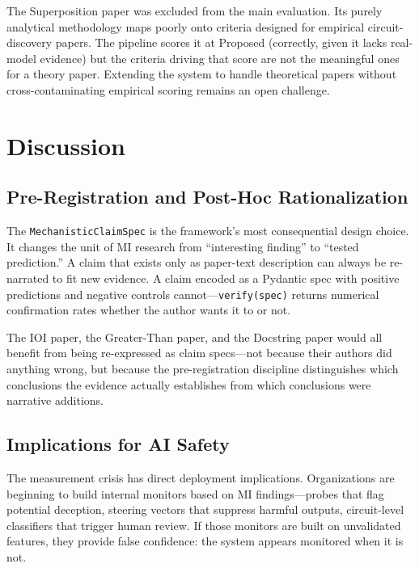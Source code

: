 \documentclass[10pt]{article}
\begin{document}
The Superposition paper \citep{elhage2022superposition} was excluded from the main evaluation. Its purely analytical methodology maps poorly onto criteria designed for empirical circuit-discovery papers. The pipeline scores it at Proposed (correctly, given it lacks real-model evidence) but the criteria driving that score are not the meaningful ones for a theory paper. Extending the system to handle theoretical papers without cross-contaminating empirical scoring remains an open challenge.

\section{Discussion}
\label{sec:discussion}

\subsection{Pre-Registration and Post-Hoc Rationalization}

The \texttt{MechanisticClaimSpec} is the framework's most consequential design choice. It changes the unit of MI research from ``interesting finding'' to ``tested prediction.'' A claim that exists only as paper-text description can always be re-narrated to fit new evidence. A claim encoded as a Pydantic spec with positive predictions and negative controls cannot---\texttt{verify(spec)} returns numerical confirmation rates whether the author wants it to or not.

The IOI paper, the Greater-Than paper, and the Docstring paper would all benefit from being re-expressed as claim specs---not because their authors did anything wrong, but because the pre-registration discipline distinguishes which conclusions the evidence actually establishes from which conclusions were narrative additions.

\subsection{Implications for AI Safety}

The measurement crisis has direct deployment implications. Organizations are beginning to build internal monitors based on MI findings---probes that flag potential deception, steering vectors that suppress harmful outputs, circuit-level classifiers that trigger human review. If those monitors are built on unvalidated features, they provide false confidence: the system appears monitored when it is not.
\end{document}
